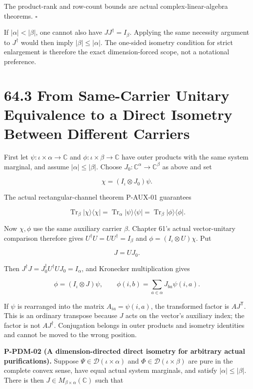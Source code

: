 \documentclass[
  11pt,
  oneside]{book}
\begin{document}
The product-rank and row-count bounds are actual complex-linear-algebra
theorems. \(\square\)

If \(|\alpha|<|\beta|\), one cannot also have \(JJ^\dagger=I_\beta\).
Applying the same necessity argument to \(J^\dagger\) would then imply
\(|\beta|\le|\alpha|\). The one-sided isometry condition for strict
enlargement is therefore the exact dimension-forced scope, not a
notational preference.

\section{64.3 From Same-Carrier Unitary Equivalence to a Direct Isometry
Between Different Carriers}

First let \(\psi:\iota\times\alpha\to\mathbb C\) and
\(\phi:\iota\times\beta\to\mathbb C\) have outer products with the same
system marginal, and assume \(|\alpha|\le|\beta|\). Choose
\(J_0:\mathbb C^\alpha\to\mathbb C^\beta\) as above and set

\[
\chi=(I_\iota\otimes J_0)\psi.
\]

The actual rectangular-channel theorem P-AUX-01 guarantees

\[
\operatorname{Tr}_\beta |\chi\rangle\langle\chi|
=\operatorname{Tr}_\alpha|\psi\rangle\langle\psi|
=\operatorname{Tr}_\beta|\phi\rangle\langle\phi|.
\]

Now \(\chi,\phi\) use the same auxiliary carrier \(\beta\). Chapter 61's
actual vector-unitary comparison therefore gives
\(U^\dagger U=UU^\dagger=I_\beta\) and \(\phi=(I_\iota\otimes U)\chi\).
Put

\[
J=UJ_0.
\]

Then \(J^\dagger J=J_0^\dagger U^\dagger UJ_0=I_\alpha\), and Kronecker
multiplication gives

\[
\phi=(I_\iota\otimes J)\psi,
\qquad
\phi(i,b)=\sum_{a\in\alpha}J_{ba}\psi(i,a).
\]

If \(\psi\) is rearranged into the matrix \(A_{ia}=\psi(i,a)\), the
transformed factor is \(AJ^{\mathsf T}\). This is an ordinary transpose
because \(J\) acts on the vector's auxiliary index; the factor is not
\(AJ^\dagger\). Conjugation belongs in outer products and isometry
identities and cannot be moved to the wrong position.

\label{p-pdm-02}{}

\textbf{P-PDM-02 (A dimension-directed direct isometry for arbitrary
actual purifications).} Suppose \(\Psi\in\mathcal D(\iota\times\alpha)\)
and \(\Phi\in\mathcal D(\iota\times\beta)\) are pure in the complete
convex sense, have equal actual system marginals, and satisfy
\(|\alpha|\le|\beta|\). There is then
\(J\in M_{\beta\times\alpha}(\mathbb C)\) such that
\end{document}
